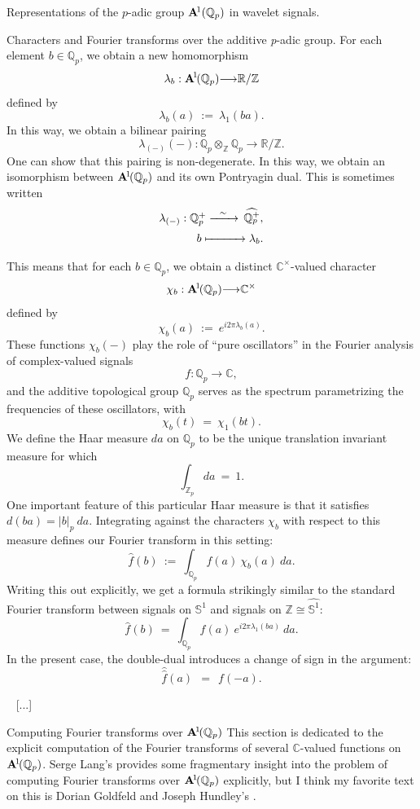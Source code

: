\documentclass[letterpaper,11pt, reqno]{amsart}
\newtheorem{monodromy theorem}{Monodromy Theorem}[subsection]
\newtheorem{wild conjecture}[theorem]{Wild Conjecture}
\newtheorem{research objectives}{Research objectives}[subsection]
\newtheorem{research question}[theorem]{Research questions}
\newtheorem{aside question}[theorem]{Aside question}
\newtheorem{audio example}[theorem]{\loudspeaker[3] Example}
\newtheorem{blank remark}[theorem]{}
\newtheorem{terminology and comment}[theorem]{Terminology and comment}
\newtheorem{purity hypothesis}[theorem]{Purity hypothesis}
\newtheorem{corollary of the purity hypothesis}[theorem]{Corollary of the purity hypothesis}
\newcommand{\CC} {{\mathbb C}}
\newcommand{\QQ} {{\mathbb Q}}
\newcommand{\RR} {{\mathbb R}}
\newcommand{\ZZ} {{\mathbb Z}}
\newcommand{\lra}{{\longrightarrow}}
\numberwithin{equation}{theorem}
\begin{document}
\begin{section}{Representations of the $p$-adic group $\bold{A}^{\!1}(\mathbb{Q}_{p})$ in wavelet signals.}
\begin{subsection}{Characters and Fourier transforms over the additive {\em p}-adic group.}
	For each element $b\in\QQ_{p}$, we obtain a new homomorphism
	$$
	\lambda_{b}:\bold{A}^{\!1\!}(\QQ_{p})\lra\RR/\ZZ
	$$
defined by
	$$
	\lambda_{b}(a)\ :=\ \lambda_{1}(ba).
	$$
In this way, we obtain a bilinear pairing
	$$
	\lambda_{(-)}(-):
	\QQ_{p}\otimes_{\ZZ}\QQ_{p}\lra\RR/\ZZ.
	$$
One can show that this pairing is non-degenerate. In this way, we obtain an isomorphism between $\bold{A}^{\!1\!}(\QQ_{p})$ and its own Pontryagin dual. This is sometimes written
	$$
	\begin{array}{c}
	\lambda_{(-)}:\QQ^{+}_{p}\xrightarrow{\ \ \sim\ \ }\ \!\widehat{\QQ^{+}_{p}},
	\\[6pt]
	\ \ \ \ \ \ \ \ \ \ b\xmapsto{\ \ \ \ \ \ \ \ \ } \lambda_{b}.
	\end{array}
	$$
	
	This means that for each $b\in\QQ_{p}$, we obtain a distinct $\CC^\times$-valued character
	$$
	\chi_{b}:\bold{A}^{\!1\!}(\QQ_{p})\lra\CC^\times
	$$
defined by
	$$
	\chi_{b}(a)
	\ :=\ 
	e^{i2\pi\lambda_{b}(a)}.
	$$
These functions $\chi_{b}(-)$ play the role of ``pure oscillators'' in the Fourier analysis of complex-valued signals
	$$
	f:\QQ_{p}\lra\CC,
	$$
and the additive topological group $\QQ_{p}$ serves as the spectrum parametrizing the frequencies of these oscillators, with
	$$
	\chi_{b}(t)
	\ =\ 
	\chi_{1}(bt).
	$$
We define the Haar measure $da$ on $\QQ_{p}$ to be the unique translation invariant measure for which
	$$
	\int_{\ZZ_{p}}\!\!\!\!da\ =\ 1.
	$$
One important feature of this particular Haar measure is that it satisfies $d(ba)=|b|_{p}\ da$. Integrating against the characters $\chi_{b}$ with respect to this measure defines our Fourier transform in this setting:
	$$
	\widehat{f}(b)
	\ :=\ 
	\int_{\QQ_{p}}\!\!\!f(a)\ \chi_{b}(a)\ da.
	$$
Writing this out explicitly, we get a formula strikingly similar to the standard Fourier transform between signals on $\mathbb{S}^{1}$ and signals on $\ZZ\cong\widehat{\mathbb{S}^{1}}$:
	$$
	\widehat{f}(b)
	\ =\ 
	\int_{\QQ_{p}}\!\!\!f(a)\ e^{i2\pi\lambda_{1}(ba)}\ da.
	$$
In the present case, the double-dual introduces a change of sign in the argument:
	$$
	\widehat{\text{$\!\!\widehat{f}$}}
	(a)
	\ \ =\ \ 
	f(-a).
	$$

\ 
{\color{red} [...]}

\end{subsection}

\begin{subsection}{Computing Fourier transforms over $\bold{A}^{\!1\!}(\QQ_{p})$}
This section is dedicated to the explicit computation of the Fourier transforms of several $\CC$-valued functions on $\bold{A}^{\!1\!}(\QQ_{p})$. Serge Lang's \cite[\S VII.1, pp. 92-93]{Lang} provides some fragmentary insight into the problem of computing Fourier transforms over $\bold{A}^{\!1\!}(\QQ_{p})$ explicitly, but I think my favorite text on this is Dorian Goldfeld and Joseph Hundley's \cite[\S\S 1.5-6, pp. 12-18]{GHv1}.


\end{subsection}
\end{section}
\end{document}
